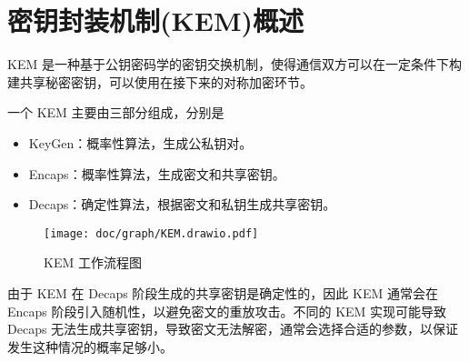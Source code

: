 \section{密钥封装机制(KEM)概述}

KEM 是一种基于公钥密码学的密钥交换机制，使得通信双方可以在一定条件下构建共享秘密密钥，可以使用在接下来的对称加密环节。

一个 KEM 主要由三部分组成，分别是
\begin{itemize}
  \item KeyGen：概率性算法，生成公私钥对。
  \item Encaps：概率性算法，生成密文和共享密钥。
  \item Decaps：确定性算法，根据密文和私钥生成共享密钥。
\end{itemize}

\begin{figure}[ht]
  \centering
  \texttt{[image: doc/graph/KEM.drawio.pdf]}
  \caption{KEM 工作流程图}
\end{figure}

由于 KEM 在 Decaps 阶段生成的共享密钥是确定性的，因此 KEM 通常会在 Encaps 阶段引入随机性，以避免密文的重放攻击。不同的 KEM 实现可能导致 Decaps 无法生成共享密钥，导致密文无法解密，通常会选择合适的参数，以保证发生这种情况的概率足够小。